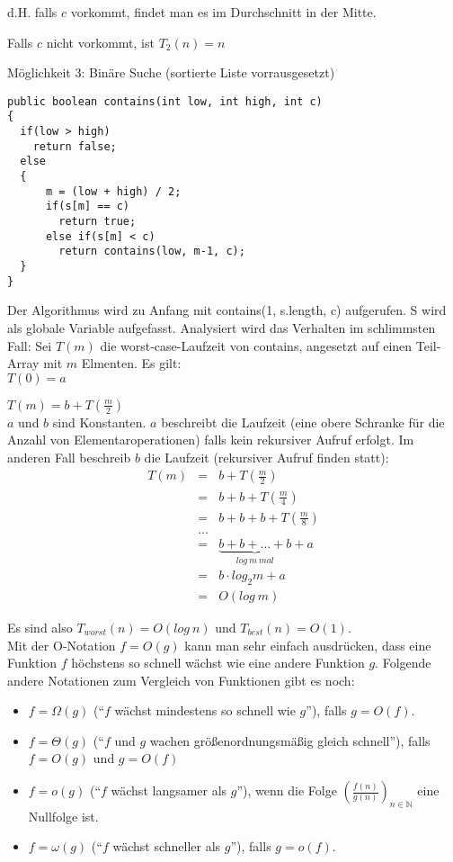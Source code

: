 \documentclass[12pt, twoside]{article}
\begin{document}
d.H. falls $c$ vorkommt, findet man es im Durchschnitt in der Mitte.

Falls $c$ nicht vorkommt, ist $T_2(n)=n$ \\
\newpage

Möglichkeit 3: {\tiny Binäre Suche (sortierte Liste vorrausgesetzt)}
\begin{lstlisting}[frame=single]
public boolean contains(int low, int high, int c)
{
  if(low > high)
    return false;
  else
  {
      m = (low + high) / 2;
      if(s[m] == c)
        return true;
      else if(s[m] < c)
        return contains(low, m-1, c);
  }  
}
\end{lstlisting}

Der Algorithmus wird zu Anfang mit contains(1, s.length, c) aufgerufen. S wird als globale Variable aufgefasst. Analysiert wird das Verhalten im schlimmsten Fall:
Sei $T(m)$ die worst-case-Laufzeit von contains, angesetzt auf einen Teil-Array mit $m$ Elmenten. Es gilt:\\

$T(0)=a$

$T(m)=b+T(\frac{m}{2})$ \\

$a$ und $b$ sind Konstanten. $a$ beschreibt die Laufzeit (eine obere Schranke für die Anzahl von Elementaroperationen) falls kein rekursiver Aufruf erfolgt. Im anderen Fall beschreib $b$ die Laufzeit (rekursiver Aufruf finden statt): \\

\begin{eqnarray}
T(m) & = & b+T( \frac{m}{2})  \\
     & = & b+b+T( \frac{m}{4}) \\
     & = & b+b+b+T(\frac{m}{8}) \\
     & \dots & \\
     & = & \underbrace{b+b+ \dots +b}_{log\  m\  mal}+a \\
     & = & b \cdot log_2 m+a \\
     & = & O(log\ m)
\end{eqnarray}

Es sind also $T_{worst}(n)=O(log \ n)$ und $T_{best}(n)=O(1)$. \\

Mit der O-Notation $f=O(g)$ kann man sehr einfach ausdrücken, dass eine Funktion $f$ höchstens 
so schnell wächst wie eine andere Funktion $g$. Folgende andere Notationen zum Vergleich von Funktionen
gibt es noch: \\
\begin{itemize}
\item $f=\Omega(g)$ ("`$f$ wächst mindestens so schnell wie $g$"'), falls $g=O(f)$.
\item $f=\Theta(g)$ ("`$f$ und $g$ wachen größenordnungsmäßig gleich schnell"'), falls $f=O(g)$ und $g=O(f)$
\item $f=o(g)$ ("`$f$ wächst langsamer als $g$"'), wenn die Folge $(\frac{f(n)}{g(n)})_{n \in \mathbb{N}}$ eine Nullfolge ist. 
\item $f=\omega(g)$ ("`$f$ wächst schneller als $g$"'), falls $g=o(f)$. 
\end{itemize}
\end{document}
